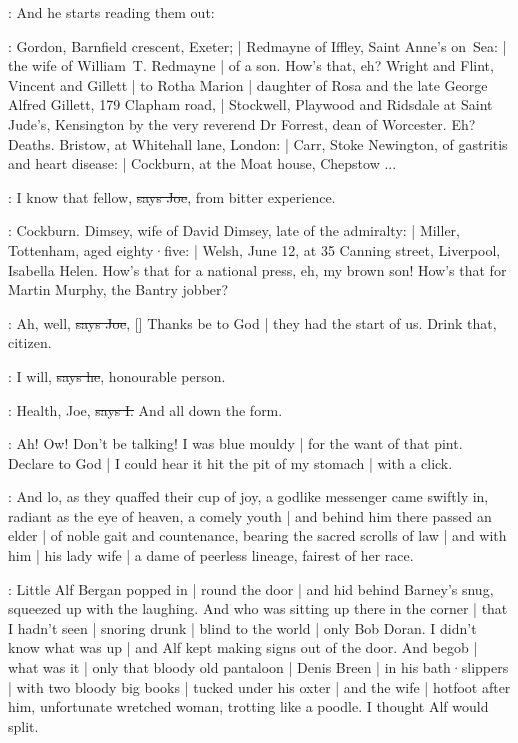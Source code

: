 \Nq:
And he starts reading them out:

\citizen:
Gordon,
Barnfield crescent,
Exeter; |
Redmayne of Iffley,
Saint Anne's on~Sea: |
the wife of William~T. Redmayne |
of a son.
How's that,
eh?
Wright and Flint,
Vincent and Gillett |
to Rotha Marion |
daughter of Rosa and the late George Alfred Gillett,
179 Clapham road, |
Stockwell, Playwood and Ridsdale at Saint Jude's,
Kensington by the very reverend Dr Forrest,
dean of Worcester.
Eh?
Deaths.
Bristow,
at Whitehall lane,
London: |
Carr,
Stoke Newington,
of gastritis and heart disease: |
Cockburn,
at the Moat house,
Chepstow ...

\joe:
I know that fellow,
\sout{says Joe},
from bitter experience.

\citizen:
Cockburn.
Dimsey,
wife of David Dimsey,
late of the admiralty: |
Miller,
Tottenham,
aged eighty·five: |
Welsh,
June 12,
at 35 Canning street,
Liverpool,
Isabella Helen.
How's that for a national press,
eh,
my brown son!
How's that for Martin Murphy,
the Bantry jobber?

\joe:
Ah, well,
\sout{says Joe},
[]
Thanks be to God |
they had the start of us.
Drink that,
citizen.

\citizen:
I will,
\sout{says he},
honourable person.

:
Health,
Joe,
\sout{says I.}
And all down the form.

\Nq:
Ah!
Ow!
Don't be talking!
I was blue mouldy |
for the want of that pint.
Declare to God |
I could hear it hit the pit of my stomach |
with a click.

:
And lo,
as they quaffed their cup of joy,
a godlike messenger came swiftly in,
radiant as the eye of heaven,
a comely youth |
and behind him
there passed an elder |
of noble gait and countenance,
bearing the sacred scrolls of law |
and with him |
his lady wife |
a dame of peerless lineage,
fairest of her race.

\Nq:
Little Alf Bergan popped in |
round the door |
and hid behind Barney's snug,
squeezed up with the laughing.
And who was sitting up there in the corner |
that I hadn't seen |
snoring drunk |
blind to the world |
only Bob Doran.
I didn't know what was up |
and Alf kept making signs out of the door.
And begob |
what was it |
only that bloody old pantaloon |
Denis Breen |
in his bath·slippers |
with two bloody big books |
tucked under his oxter |
and the wife |
hotfoot after him,
unfortunate wretched woman,
trotting like a poodle.
I thought Alf would split.

